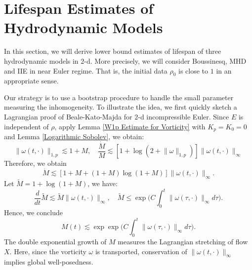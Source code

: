 \documentclass[12pt,letterpaper]{article}
\theoremstyle{plain}
\begin{document}
\section{Lifespan Estimates of Hydrodynamic Models}

In this section, we will derive lower bound estimates of lifespan of  three hydrodynamic models in $2$-d. More precisely, we will consider Boussinesq, MHD and IIE in near Euler regime. That is, the initial data $\rho_0$ is close to $1$ in an appropriate sense. 

Our strategy is to use a bootstrap procedure to handle the small parameter measuring the inhomogeneity. To illustrate the idea, we first quickly sketch a Lagrangian proof of Beale-Kato-Majda for $2$-d incompressible Euler. Since $E$ is independent of $\rho$, apply Lemma \ref{W1p Estimate for Vorticity} with $K_p=K_0=0$ and Lemma \ref{Logarithmic Sobolev}, we obtain:
\begin{equation*}
  \lVert\omega(t,\cdot)\rVert_{1,p}\lesssim 1+M,\quad  \frac{\dot M}{M}\lesssim [1+\log(2+ \lVert\omega\rVert_{1,p})]\lVert\omega(t,\cdot)\rVert_\infty
\end{equation*}
Therefore, we obtain 
\begin{equation*}
 \dot M\lesssim [1+M+(1+M)\log(1+M)]\lVert\omega(t,\cdot)\rVert_\infty.   
\end{equation*}
Let $\tilde M=1+\log(1+M)$, we have:
\begin{equation*}
 \frac{d}{dt}\tilde M\lesssim  \tilde M\lVert \omega(t,\cdot)\rVert_\infty,\quad \tilde M\le \exp\bigg(C\int_0^t \lVert\omega(\tau,\cdot)\rVert_\infty d\tau\bigg). 
\end{equation*}
Hence, we conclude
\begin{equation*}
  M(t)\lesssim   \exp\exp\bigg(C\int_0^t \lVert\omega(\tau,\cdot)\rVert_\infty d\tau\bigg).
\end{equation*}
 The double exponential growth of $M$ measures the Lagrangian stretching of flow $X$. Here, since the vorticity $\omega$ is transported, conservation of $\lVert\omega(t,\cdot)\rVert_\infty$ implies global well-posedness.
\end{document}
